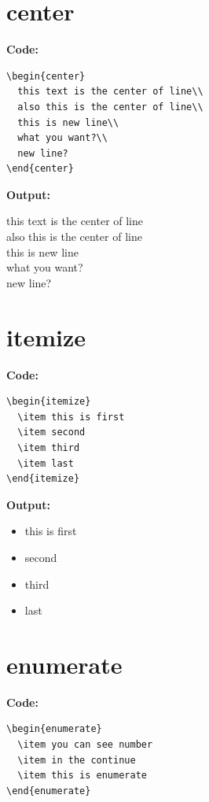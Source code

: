 \documentclass{book}
\newcommand{\myc}{\noindent\textbf{{\color{blue} Code}:}}
\newcommand{\myo}{\noindent\textbf{{\color{blue} Output}:\\}}
\begin{document}
\section{center}

\myc
\begin{lstlisting}
\begin{center}
  this text is the center of line\\
  also this is the center of line\\
  this is new line\\
  what you want?\\
  new line?
\end{center}
\end{lstlisting}

\myo
\begin{center}
  this text is the center of line\\
  also this is the center of line\\
  this is new line\\
  what you want?\\
  new line?
\end{center}

\section{itemize}
\myc
\begin{lstlisting}
\begin{itemize}
  \item this is first
  \item second
  \item third
  \item last
\end{itemize}
\end{lstlisting}

\myo
\begin{itemize}
  \item this is first
  \item second
  \item third
  \item last
\end{itemize}

\section{enumerate}
\myc
\begin{lstlisting}
\begin{enumerate}
  \item you can see number
  \item in the continue
  \item this is enumerate
\end{enumerate}
\end{lstlisting}
\end{document}
